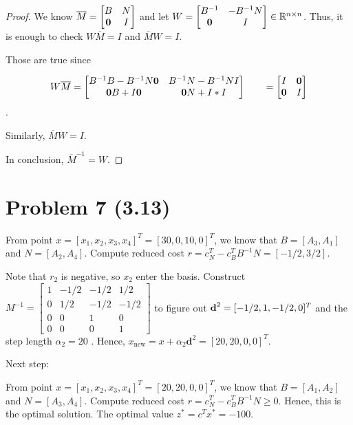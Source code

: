 \documentclass[12pt]{article}
\begin{document}
\begin{proof}

We know $\overline{M} = \begin{bmatrix}
 B & N \\
\textbf 0 & I
\end{bmatrix}$ and let $W = \begin{bmatrix}
 B^{-1} & -B^{-1}N \\
\textbf 0 & I
\end{bmatrix} \in \mathbb{R}^{n\times n}$. Thus, it is enough to check $W\overline M = I$ and $\overline M W = I$.

Those are true since

$$
W\overline M = \begin{bmatrix}
B^{-1}B - B^{-1}N\textbf 0 & B^{-1}N - B^{-1}NI \\
\textbf 0 B + I \textbf 0 & \textbf 0 N + I*I
\end{bmatrix} \qquad = \begin{bmatrix}
I & \textbf 0 \\
\textbf 0 & I
\end{bmatrix}
$$. 

Similarly, $\overline M W = I$. 

In conclusion, $\overline{M}^{-1} = W$.

\end{proof}

\section*{Problem 7 (3.13)}

From point $x = [x_1, x_2, x_3, x_4]^T = [30, 0, 10, 0]^T$, we know that $B = [A_3, A_1]$ and $N = [A_2, A_4]$. Compute reduced cost $r = c_N^T - c_B^TB^{-1}N = [-1/2, 3/2]$.

Note that $r_2$ is negative, so $x_2$ enter the basis. Construct $M^{-1} = \begin{bmatrix}
1 & -1/2 & -1/2 & 1/2 \\
0 & 1/2 & -1/2 & -1/2 \\
0 & 0 & 1 & 0  \\
0 & 0 & 0 & 1 
\end{bmatrix}$ to figure out $\textbf d^2 = [-1/2, 1, -1/2, 0]^T$  and the step length $\alpha_2 = 20$ . Hence, $x_{\text{new}} = x + \alpha_2\textbf{d}^2 = [20, 20, 0, 0]^T$. 

Next step:

From point $x = [x_1, x_2, x_3, x_4]^T = [20, 20, 0, 0]^T$, we know that $B = [A_1, A_2]$ and $N = [A_3, A_4]$. Compute reduced cost $r = c_N^T - c_B^TB^{-1}N \geqslant 0$. Hence, this is the optimal solution. The optimal value $z^* = c^Tx^* = -100 $.
\end{document}
